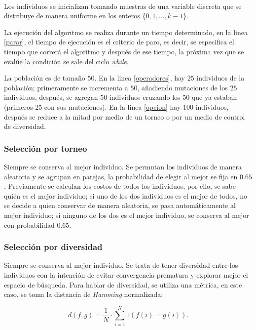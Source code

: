 \documentclass[10pt,a4paper]{article}
\begin{document}
\ \\

\noindent Los individuos se inicializan tomando muestras de una variable discreta que se distribuye de manera uniforme en los enteros $\{0, 1, \dots, k-1 \}$.

\noindent La ejecución del algoritmo se realiza durante un tiempo determinado, en la linea \ref{parar}, el tiempo de ejecución es el criterio de paro, es decir, se especifica el tiempo que correrá el algoritmo y después de ese tiempo, la próxima vez que se evalúe la condición se sale del ciclo \textit{while}.

\noindent La población es de tamaño $50$. En la linea \ref{operadores}, hay $25$ individuos de la población; primeramente se incrementa a $50$, añadiendo mutaciones de los $25$ individuos, después, se agregan $50$ individuos cruzando los $50$ que ya estaban (primeros $25$ con sus mutaciones). En la linea \ref{opcion} hay $100$ individuos, después se reduce a la mitad por medio de un torneo o por un medio de control de diversidad.

\subsubsection*{Selección por torneo}

\noindent Siempre se conserva al mejor individuo. Se permutan los individuos de manera aleatoria y se agrupan en parejas, la probabilidad de elegir al mejor se fija en $0{.}65$. Previamente se calculan los costos de todos los individuos, por ello, se sabe quién es el mejor individuo; si uno de los dos individuos es el mejor de todos, no se decide a quien conservar de manera aleatoria, se pasa automáticamente al mejor individuo; si ninguno de los dos es el mejor individuo, se conserva al mejor con probabilidad $0{.}65$.

\subsubsection*{Selección por diversidad}

\noindent Siempre se conserva al mejor individuo. Se trata de tener diversidad entre los individuos con la intención de evitar convergencia prematura y explorar mejor el espacio de búsqueda. Para hablar de diversidad, se utiliza una métrica, en este caso, se toma la distancia de \textit{Hamming} normalizada:

\begin{equation*}
d(f, g) = \dfrac{1}{N} \cdot \sum_{i=1}^N 1 \left( f(i) = g(i) \right).
\end{equation*} 
\end{document}
